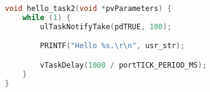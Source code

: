 \begin{lstlisting}[language=c,caption=Problem 1 Print Task, label=list:p1_task2]
void hello_task2(void *pvParameters) {
    while (1) {
        ulTaskNotifyTake(pdTRUE, 100);

        PRINTF("Hello %s.\r\n", usr_str);

        vTaskDelay(1000 / portTICK_PERIOD_MS);
    }
}
\end{lstlisting}
